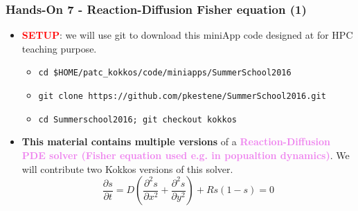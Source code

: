 \begin{frame}
  \frametitle{Hands-On 7 - Reaction-Diffusion Fisher equation (1)}

  \hypertarget{handson7}{}
  \begin{itemize}
  \item \textcolor{red}{\textbf{SETUP}}: we will use git to download this miniApp code designed at  for HPC teaching purpose.
    \begin{itemize}
    \item \texttt{cd \$HOME/patc\_kokkos/code/miniapps/SummerSchool2016}
    \item \texttt{git clone https://github.com/pkestene/SummerSchool2016.git}
    \item \texttt{cd Summerschool2016; git checkout kokkos}
    \end{itemize}
  \item \textbf{This material contains multiple versions} of a \textcolor{violet}{\textbf{Reaction-Diffusion PDE solver (Fisher equation used e.g. in popualtion dynamics)}}. We will contribute two Kokkos versions of this solver.
    $$ \frac{\partial s}{\partial t} = D \left( \frac{\partial^2 s}{\partial x^2} + \frac{\partial^2 s}{\partial y^2} \right) + R s (1-s) = 0$$
  \end{itemize}
  
\end{frame}

